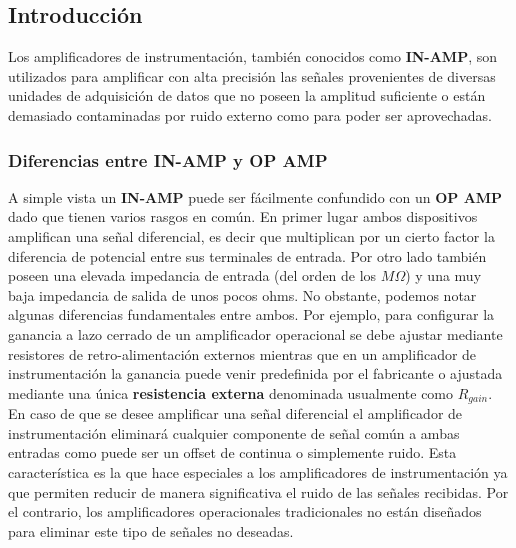 
	\subsection{Introducción}
	Los amplificadores de instrumentación, también conocidos como \textbf{IN-AMP}, son utilizados para amplificar con alta precisión las señales provenientes de diversas unidades de adquisición de datos que no poseen la amplitud suficiente o están demasiado contaminadas por ruido externo como para poder ser aprovechadas.
	\subsubsection{Diferencias entre \textbf{IN-AMP} y \textbf{OP AMP}}
	A simple vista un \textbf{IN-AMP} puede ser fácilmente confundido con un \textbf{OP AMP} dado que tienen varios rasgos en común. En primer lugar ambos dispositivos amplifican una señal diferencial, es decir que multiplican por un cierto factor la diferencia de potencial entre sus terminales de entrada. Por otro lado también poseen una elevada impedancia de entrada (del orden de los $M\Omega$) y una muy baja impedancia de salida de unos pocos ohms.
	No obstante, podemos notar algunas diferencias fundamentales entre ambos. Por ejemplo, para configurar la ganancia a lazo cerrado de un amplificador operacional se debe ajustar mediante resistores de retro-alimentación externos mientras que en un amplificador de instrumentación la ganancia puede venir predefinida por el fabricante o ajustada mediante una única \textbf{resistencia externa} denominada usualmente como \textbf{$R_{gain}$}.
	En caso de que se desee amplificar una señal diferencial el amplificador de instrumentación eliminará cualquier componente de señal común a ambas entradas como puede ser un offset de continua o simplemente ruido. Esta característica es la que hace especiales a los amplificadores de instrumentación ya que permiten reducir de manera significativa el ruido de las señales recibidas.  
	Por el contrario, los amplificadores operacionales tradicionales no están diseñados para eliminar este tipo de señales no deseadas.

	
